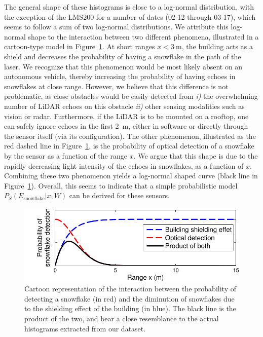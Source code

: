 The general shape of these histograms is close to a log-normal distribution, with the exception of the LMS200 for a number of dates (02-12 through 03-17), which seems to follow a sum of two log-normal distributions. We attribute this log-normal shape to the interaction between two different phenomena, illustrated in a cartoon-type model in Figure~\ref{fig:CartoonModel}. At short ranges $x<\SI{3}{\meter}$, the building acts as a shield and decreases the probability of having a snowflake in the path of the laser. We recognize that this phenomenon would be most likely absent on an autonomous vehicle, thereby increasing the probability of having echoes in snowflakes at close range. However, we believe that this difference is not problematic, as close obstacles would be easily detected from \emph{i)} the overwhelming number of  LiDAR echoes on this obstacle \emph{ii)} other sensing modalities such as vision or radar. Furthermore, if the LiDAR is to be mounted on a rooftop, one can safely  ignore echoes in the first \SI{2}{\meter}, either in software or directly through the sensor itself (via its configuration). The other phenomenon, illustrated as the red dashed line in Figure~\ref{fig:CartoonModel}, is the probability of optical detection of a snowflake by the sensor as a function of the range $x$. We argue that this shape is due to the rapidly decreasing light intensity of the echoes in snowflakes, as a function of $x$. Combining these two phenomenon yields a log-normal shaped curve (black line in Figure~\ref{fig:CartoonModel}). Overall, this seems to indicate that a simple probabilistic model $P_S(E_\text{snowflake}|x,W)$ can be derived for these sensors.

\begin{figure}
    \centering
    \includegraphics[trim={0.6cm 0 0 0},clip,width=0.7\linewidth]{./img/chap_lidar/ShieldingModel.pdf}
    \caption[Cartoon representation of the interaction between the probability of detecting a snowflake and the diminution of snowflakes due to the shielding effect of the building.]{Cartoon representation of the interaction between the probability of detecting a snowflake (in red) and the diminution of snowflakes due to the shielding effect of the building (in blue). The black line is the product of the two, and bear a close resemblance to the actual histograms extracted from our dataset.}
    \label{fig:CartoonModel}
\end{figure}


